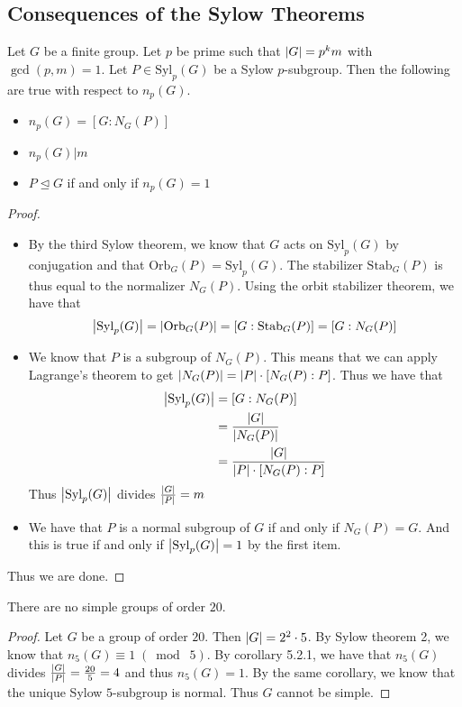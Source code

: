 \documentclass[a4paper]{article}
\begin{document}
\subsection{Consequences of the Sylow Theorems}
\begin{crl}{}{} Let $G$ be a finite group. Let $p$ be prime such that $\abs{G}=p^km$ with $\gcd(p,m)=1$. Let $P\in\text{Syl}_p(G)$ be a Sylow $p$-subgroup. Then the following are true with respect to $n_p(G)$. 
\begin{itemize}
\item $n_p(G)=[G:N_G(P)]$
\item $n_p(G)|m$
\item $P\trianglelefteq G$ if and only if $n_p(G)=1$
\end{itemize} \tcbline
\begin{proof}~\\
\begin{itemize}
\item By the third Sylow theorem, we know that $G$ acts on $\text{Syl}_p(G)$ by conjugation and that $\text{Orb}_G(P)=\text{Syl}_p(G)$. The stabilizer $\text{Stab}_G(P)$ is thus equal to the normalizer $N_G(P)$. Using the orbit stabilizer theorem, we have that $$\abs{\text{Syl}_p(G)}=\abs{\text{Orb}_G(P)}=[G:\text{Stab}_G(P)]=[G:N_G(P)]$$
\item We know that $P$ is a subgroup of $N_G(P)$. This means that we can apply Lagrange's theorem to get $\abs{N_G(P)}=\abs{P}\cdot[N_G(P):P]$. Thus we have that 
\begin{align*}
\abs{\text{Syl}_p(G)}&=[G:N_G(P)]\\
&=\frac{\abs{G}}{\abs{N_G(P)}}\\
&=\frac{\abs{G}}{\abs{P}\cdot[N_G(P):P]}
\end{align*}
Thus $\abs{\text{Syl}_p(G)}$ divides $\frac{\abs{G}}{\abs{P}}=m$
\item We have that $P$ is a normal subgroup of $G$ if and only if $N_G(P)=G$. And this is true if and only if $\abs{\text{Syl}_p(G)}=1$ by the first item. 
\end{itemize}
Thus we are done. 
\end{proof}
\end{crl}

\begin{prp}{}{} There are no simple groups of order $20$. \tcbline
\begin{proof}
Let $G$ be a group of order $20$. Then $\abs{G}=2^2\cdot 5$. By Sylow theorem 2, we know that $n_5(G)\equiv 1\;(\bmod\;5)$. By corollary 5.2.1, we have that $n_5(G)$ divides $\frac{\abs{G}}{\abs{P}}=\frac{20}{5}=4$ and thus $n_5(G)=1$. By the same corollary, we know that the unique Sylow $5$-subgroup is normal. Thus $G$ cannot be simple. 
\end{proof}
\end{prp}
\end{document}
